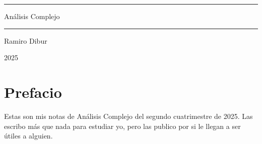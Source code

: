 \documentclass[11pt, a4paper, oneside]{book}
\theoremstyle{mdtheorem}
\theoremstyle{mddefinition}
\theoremstyle{remark}
\begin{document}
\frontmatter

\begin{titlepage}
    \begin{center}
        \vspace*{1cm}
        
        \sffamily
        \bfseries
        \textcolor{primarycolor}{\rule{\linewidth}{2pt}}
        \vspace{0.4cm}
        
        {\Huge Análisis Complejo \par}
        
        \vspace{0.4cm}
        \textcolor{primarycolor}{\rule{\linewidth}{2pt}}
        
        \vspace{2cm}
        
        {\Large Ramiro Dibur \par}
        \vspace{1cm}
        {\large 2025 \par}
    \end{center}
\end{titlepage}

\tableofcontents

\mainmatter

\chapter*{Prefacio}

Estas son mis notas de Análisis Complejo del segundo cuatrimestre de 2025. Las escribo más que nada para estudiar yo, pero las publico por si le llegan a ser útiles a alguien.


\end{document}
